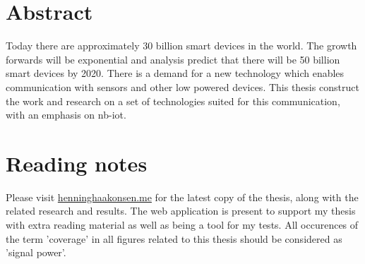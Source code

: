 
\vspace*{2cm}
\thispagestyle{plain}

\section*{Abstract} \label{section:abstract}

Today there are approximately 30 billion smart devices in the world. The growth forwards will be exponential and analysis predict that there will be 50 billion smart devices by 2020. There is a demand for a new technology which enables communication with sensors and other low powered devices. This thesis construct the work and research on a set of technologies suited for this communication, with an emphasis on \acrshort{nb-iot}.

\section*{Reading notes} \label{section:readingnotes}

Please visit \url{henninghaakonsen.me} for the latest copy of the thesis, along with the related research and results. The web application is present to support my thesis with extra reading material as well as being a tool for my tests. All occurences of the term 'coverage' in all figures related to this thesis should be considered as 'signal power'.
